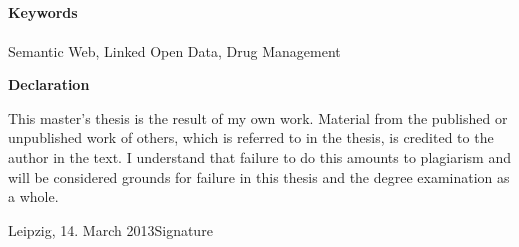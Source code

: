\documentclass[%
  parskip=half,
  ]{scrreprt} %
\title{%
\dipltitle\\%
\bigskip\usekomafont{subtitle}%
\parbox[h]{0.8\textwidth}{\begin{center}\diplsubtitle\end{center}}%
}
\subtitle{\usekomafont{subject}\vspace{3em}\diplsubject}
\author{}
\date{}
\newcommand{\rem}[1]{\textcolor{remcolor}{\emph{#1}}}
\begin{document}

\ifpdf
{}
\else
{}
\fi


\maketitle





\paragraph{Keywords} Semantic Web, Linked Open Data, Drug Management

\setcounter{tocdepth}{1}
\tableofcontents

\clearpage














\appendix




%

\listoffigures
\listoftables

\clearpage
\pagestyle{empty}
\vspace*{1cm}
\begin{center}
\textbf{\sffamily Declaration}
\end{center}
\vspace*{0.5cm}
This master's thesis is the result of my own work. Material from the published or unpublished work of others, which is referred to in the thesis, is credited to the author in the text. I understand that failure to do this amounts to plagiarism and will be considered grounds for failure in this thesis and the degree examination as a whole.

\vspace{2cm}
\noindent
Leipzig, 14. March 2013\hfill Signature
\end{document}
